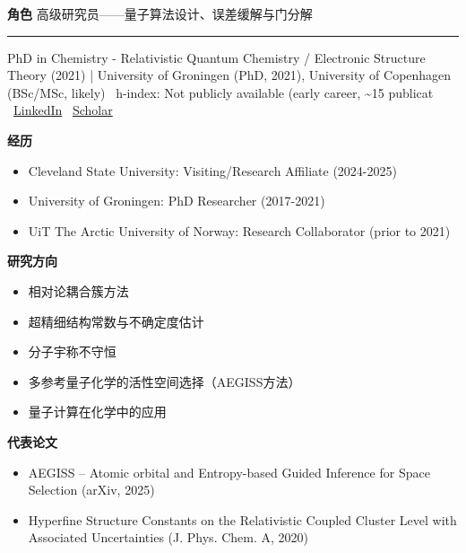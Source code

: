 \par{\footnotesize\color{mainred}\textbf{角色}} {\footnotesize 高级研究员——量子算法设计、误差缓解与门分解}
\vspace{2pt}\hrule\vspace{2pt}
\vspace{4pt}
\par{\footnotesize\color{graytext}PhD in Chemistry - Relativistic Quantum Chemistry / Electronic Structure Theory (2021) | University of Groningen (PhD, 2021), University of Copenhagen (BSc/MSc, likely) \textbar\  h-index: Not publicly available (early career, \textasciitilde{}15 publicat \textbar\  \href{https://www.linkedin.com/in/pi-a-b-haase/}{LinkedIn} \textbar\  \href{https://arxivlens.com/Author/Details/pi-a.-b.-haase-9162-5883937}{Scholar}}
\par{\footnotesize\color{mainred}\textbf{经历}}
\begin{itemize}[leftmargin=1.2em,itemsep=0pt,topsep=0pt]
\item {\footnotesize Cleveland State University: Visiting/Research Affiliate (2024-2025)}
\item {\footnotesize University of Groningen: PhD Researcher (2017-2021)}
\item {\footnotesize UiT The Arctic University of Norway: Research Collaborator (prior to 2021)}
\end{itemize}
\par{\footnotesize\color{mainred}\textbf{研究方向}}
\begin{itemize}[leftmargin=1.2em,itemsep=0pt,topsep=0pt]
\item {\footnotesize 相对论耦合簇方法}
\item {\footnotesize 超精细结构常数与不确定度估计}
\item {\footnotesize 分子宇称不守恒}
\item {\footnotesize 多参考量子化学的活性空间选择（AEGISS方法）}
\item {\footnotesize 量子计算在化学中的应用}
\end{itemize}
\par{\footnotesize\color{mainred}\textbf{代表论文}}
\begin{itemize}[leftmargin=1.2em,itemsep=0pt,topsep=0pt]
\item {\footnotesize AEGISS -- Atomic orbital and Entropy-based Guided Inference for Space Selection (arXiv, 2025)}
\item {\footnotesize Hyperfine Structure Constants on the Relativistic Coupled Cluster Level with Associated Uncertainties (J. Phys. Chem. A, 2020)}
\end{itemize}
